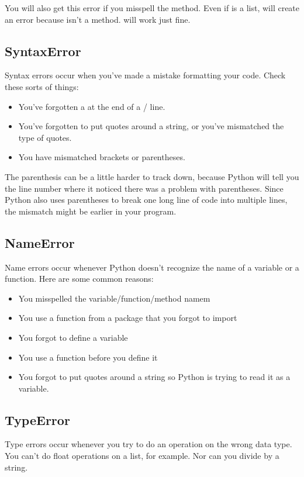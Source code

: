 You will also get this error if you misspell the method.  Even if  is a list,  will create an error because  isn't a method.   will work just fine.

\subsection*{SyntaxError}
Syntax errors occur when you've made a mistake formatting your code.  Check these sorts of things:
\begin{itemize}
\item You've forgotten a \code{:} at the end of a / line.
\item You've forgotten to put quotes around a string, or you've mismatched the type of quotes.
\item You have mismatched brackets or parentheses.
\end{itemize}
The parenthesis can be a little harder to track down, because Python will tell you the line number where it noticed there was a problem with parentheses.  Since Python also uses parentheses to break one long line of code into multiple lines, the mismatch might be earlier in your program.

\subsection*{NameError}
Name errors occur whenever Python doesn't recognize the name of a variable or a function.  Here are some common reasons:
\begin{itemize}
\item You misspelled the variable/function/method namem
\item You use a function from a package that you forgot to import
\item You forgot to define a variable
\item You use a function before you define it
\item You forgot to put quotes around a string so Python is trying to read it as a variable.
\end{itemize}

\subsection*{TypeError}
Type errors occur whenever you try to do an operation on the wrong data type.  You can't do float operations on a list, for example.  Nor can you divide by a string.

